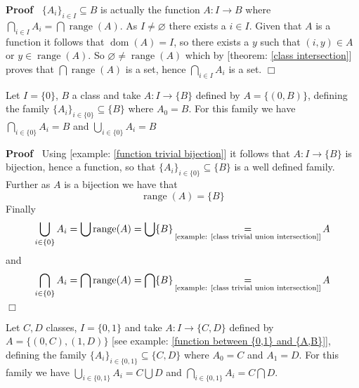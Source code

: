 \documentclass{book}
\newcommand{\equallim}{\mathop{=}\limits}
\newcommand{\tmop}[1]{\ensuremath{\operatorname{#1}}}
\newenvironment{proof}{\noindent\textbf{Proof\ }}{\hspace*{\fill}$\Box$\medskip}
\begin{document}
\begin{proof}
  $\{ A_i \}_{i \in I} \subseteq B$ is actually the function $A : I
  \rightarrow B$ where $\bigcap_{i \in I} A_i = \bigcap \tmop{range} (A)$. As
  $I \neq \varnothing$ there exists a $i \in I$. Given that $A$ is a function
  it follows that $\tmop{dom} (A) = I$, so there exists a $y$ such that $(i,
  y) \in A$ or $y \in \tmop{range} (A)$. So $\varnothing \neq \tmop{range} (A)
  $ which by [theorem: \ref{class intersection}] proves that $\bigcap
  \tmop{range} (A)$ is a set, hence $\bigcap_{i \in I} A_i$ is a set.
\end{proof}

\begin{example}
  \label{family trivial}Let $I = \{ 0 \}$, $B$ a class and take $A : I
  \rightarrow \{ B \}$ defined by $A = \{ (0, B) \}$, defining the family $\{
  A_i \}_{i \in \{ 0 \}} \subseteq \{ B \}$ where $A_0 = B$. For this family
  we have $\bigcap_{i \in \{ 0 \}} A_i = B$ and $\bigcup_{i \in \{ 0 \}} A_i =
  B$
\end{example}

\begin{proof}
  Using [example: \ref{function trivial bijection}] it follows that $A : I
  \rightarrow \{ B \}$ is bijection, hence a function, so that $\{ A_i \}_{i
  \in \{ 0 \}} \subseteq \{ B \}$ is a well defined family. Further as $A$ is
  a bijection we have that
  \[ \tmop{range} (A) = \{ B \} \]
  Finally
  \[ \bigcup_{i \in \{ 0 \}} A_i = \bigcup \tmop{range} (A) = \bigcup \{ B \}
     \equallim_{\text{[example: \ref{class trivial union intersection}]}} A \]
  and
  \[ \bigcap_{i \in \{ 0 \}} A_i = \bigcap \tmop{range} (A) = \bigcap \{ B \}
     \equallim_{\text{[example: \ref{class trivial union intersection}]}} A \]
\end{proof}

\begin{example}
  \label{family union{A,B}}Let $C, D$ classes, $I = \{ 0, 1 \}$ and take $A :
  I \rightarrow \{ C, D \}$ defined by $A = \{ (0, C), (1, D) \}$ [see
  example: \ref{function between {0,1} and {A,B}}], defining the family $\{
  A_i \}_{i \in \{ 0, 1 \}} \subseteq \{ C, D \}$ where $A_0 = C$ and $A_1 =
  D$. For this family we have $\bigcup_{i \in \{ 0, 1 \}} A_i = C \bigcup D$
  and $\bigcap_{i \in \{ 0, 1 \}} A_i = C \bigcap D$.
\end{example}
\end{document}
